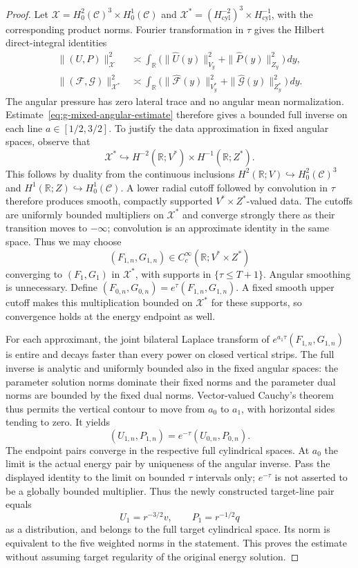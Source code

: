\documentclass[11pt,a4paper]{article}
\theoremstyle{remark}
\numberwithin{equation}{section}
\begin{document}
\begin{proof}
Let $\mathcal X=H^2_0(\mathcal C)^3\times H^1_0(\mathcal C)$ and
$\mathcal X^*=(H^{-2}_{\mathrm{cyl}})^3\times
H^{-1}_{\mathrm{cyl}}$, with the corresponding product norms.
Fourier transformation in $\tau$ gives the Hilbert direct-integral
identities
\begin{align}
 \|(U,P)\|_{\mathcal X}^2
 &\asymp\int_{\mathbb R}
   \bigl(\|\widehat U(y)\|_{V_y}^2+
         \|\widehat P(y)\|_{Z_y}^2\bigr)\,dy,
 \label{eq:g-cylindrical-plancherel}\\
 \|(\mathcal F,\mathcal G)\|_{\mathcal X^*}^2
 &\asymp\int_{\mathbb R}
   \bigl(\|\widehat{\mathcal F}(y)\|_{V_y^*}^2+
         \|\widehat{\mathcal G}(y)\|_{Z_y^*}^2\bigr)\,dy.
 \label{eq:g-cylindrical-duality}
\end{align}
The angular pressure has zero lateral trace and no angular mean
normalization. Estimate~\eqref{eq:g-mixed-angular-estimate} therefore
gives a bounded full inverse on each line $a\in[1/2,3/2]$.
To justify the data approximation in fixed angular spaces, observe that
\[
 \mathcal X^*\hookrightarrow
 H^{-2}(\mathbb R;V^*)\times H^{-1}(\mathbb R;Z^*).
\]
This follows by duality from the continuous inclusions
$H^2(\mathbb R;V)\hookrightarrow H^2_0(\mathcal C)^3$ and
$H^1(\mathbb R;Z)\hookrightarrow H^1_0(\mathcal C)$.
A lower radial cutoff followed by convolution in $\tau$ therefore
produces smooth, compactly supported $V^*\times Z^*$-valued data.
The cutoffs are uniformly bounded multipliers on $\mathcal X^*$ and
converge strongly there as their transition moves to $-\infty$;
convolution is an approximate identity in the same space.
Thus we may choose
\[
 (F_{1,n},G_{1,n})\in C_c^\infty(\mathbb R;V^*\times Z^*)
\]
converging to $(F_1,G_1)$ in $\mathcal X^*$, with supports in
$\{\tau\le T+1\}$. Angular smoothing is unnecessary.
Define $(F_{0,n},G_{0,n})=e^\tau(F_{1,n},G_{1,n})$.
A fixed smooth upper cutoff makes this multiplication bounded on
$\mathcal X^*$ for these supports, so convergence holds at the energy
endpoint as well.

For each approximant, the joint bilateral Laplace transform of
$e^{a_1\tau}(F_{1,n},G_{1,n})$ is entire and decays faster than every power on closed
vertical strips. The full inverse is analytic and uniformly bounded also in
the fixed angular spaces: the parameter solution norms dominate their fixed
norms and the parameter dual norms are bounded by the fixed dual norms.
Vector-valued Cauchy's theorem thus permits the vertical contour to move from
$a_0$ to $a_1$, with horizontal sides tending to zero. It yields
\[
 (U_{1,n},P_{1,n})=e^{-\tau}(U_{0,n},P_{0,n}).
\]
The endpoint pairs converge in the respective full cylindrical spaces. At
$a_0$ the limit is the actual energy pair by uniqueness of the angular inverse.
Pass the displayed identity to the limit on bounded $\tau$ intervals only;
$e^{-\tau}$ is not asserted to be a globally bounded multiplier. Thus the
newly constructed target-line pair equals
\[
 U_1=r^{-3/2}v,\qquad P_1=r^{-1/2}q
\]
as a distribution, and belongs to the full target cylindrical space. Its norm
is equivalent to the five weighted norms in the statement. This proves the
estimate without assuming target regularity of the original energy solution.
\end{proof}
\end{document}
